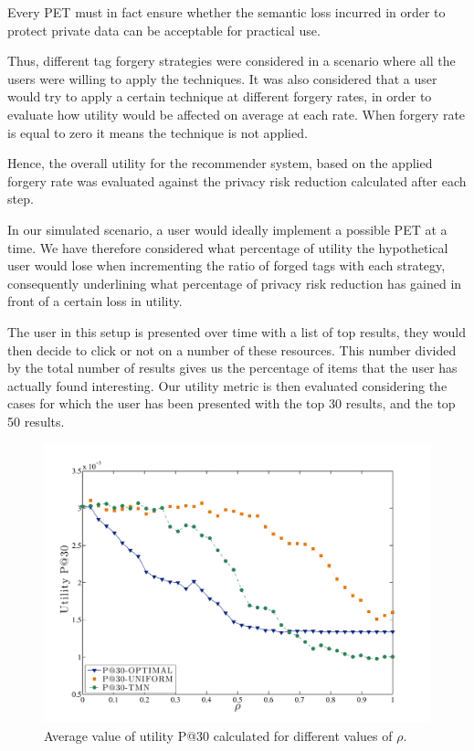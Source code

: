 Every PET must in fact ensure whether the semantic loss incurred in order to protect private data can be acceptable for practical use.

Thus, different tag forgery strategies were considered in a scenario where all the users were willing to apply the techniques. It was also considered that a user would try to apply a certain technique at different forgery rates, in order to evaluate how utility would be affected on average at each rate. When forgery rate is equal to zero it means the technique is not applied.

Hence, the overall utility for the recommender system, based on the applied forgery rate was evaluated against the privacy risk reduction calculated after each step.

In our simulated scenario, a user would ideally implement a possible PET at a time. We have therefore considered what percentage of utility the hypothetical user would lose when incrementing the ratio of forged tags with each strategy, consequently underlining what percentage of privacy risk reduction has gained in front of a certain loss in utility.

The user in this setup is presented over time with a list of top results, they would then decide to click or not on a number of these resources. This number divided by the total number of results gives us the percentage of items that the user has actually found interesting. Our utility metric is then evaluated considering the cases for which the user has been presented with the top 30 results, and the top 50 results.

\begin{figure}[htb]  
\includegraphics[width=\textwidth]{figures/Fig5a.pdf}
\caption[Utility measurement P@30.]{Average value of utility P@30 calculated for different values of $\rho$.
\label{fig:P30-Rho}}
\end{figure}

